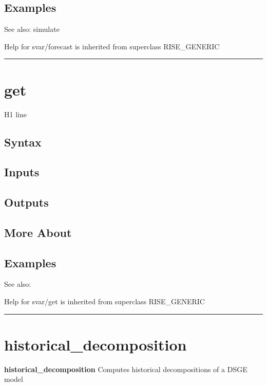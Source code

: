\documentclass[letterpaper,10pt,english]{sphinxmanual}
\begin{document}
\subsection{Examples}
\label{classes/models/@svar/svar:id24}
See also: simulate

Help for svar/forecast is inherited from superclass RISE\_GENERIC


\bigskip\hrule{}\bigskip



\section{get}
\label{classes/models/@svar/svar:id25}\label{classes/models/@svar/svar:get}
H1 line


\subsection{Syntax}
\label{classes/models/@svar/svar:id26}

\subsection{Inputs}
\label{classes/models/@svar/svar:id27}

\subsection{Outputs}
\label{classes/models/@svar/svar:id28}

\subsection{More About}
\label{classes/models/@svar/svar:id29}

\subsection{Examples}
\label{classes/models/@svar/svar:id30}
See also:

Help for svar/get is inherited from superclass RISE\_GENERIC


\bigskip\hrule{}\bigskip



\section{historical\_decomposition}
\label{classes/models/@svar/svar:historical-decomposition}\label{classes/models/@svar/svar:id31}
\textbf{historical\_decomposition} Computes historical decompositions of a DSGE model
\end{document}
